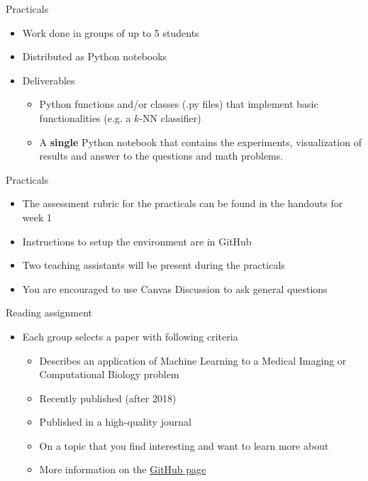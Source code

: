 \documentclass[notes]{beamer}          %
\begin{document}
\begin{frame}{Practicals}
\begin{itemize}
    \item Work done in groups of up to 5 students
    \item Distributed as Python notebooks
    \item Deliverables
    \begin{itemize}
        \item Python functions and/or classes (.py files) that implement basic functionalities (e.g. a $k$-NN classifier)
        \item A \textbf{single} Python notebook that contains the experiments, visualization of results and answer to the questions and math problems.
    \end{itemize}
\end{itemize}    
\end{frame}


\begin{frame}{Practicals}
\begin{itemize}
    \item The assessment rubric for the practicals can be found in the handouts for week 1
    \item Instructions to setup the environment are in GitHub
    \item Two teaching assistants will be present during the practicals
    	\item You are encouraged to use Canvas Discussion to ask general questions
\end{itemize}    
\end{frame}


\begin{frame}{Reading assignment}
\begin{itemize}
    \item Each group selects a paper with following criteria
    \begin{itemize}
        \item Describes an application of Machine Learning to a Medical Imaging or Computational Biology problem
		\item Recently published (after 2018)
		\item Published in a high-quality journal
		\item	 On a topic that you find interesting and want to learn more about
        \item More information on the \href{https://github.com/tueimage/8dm50-machine-learning/blob/master/reading_assignment.md}{GitHub page}
    \end{itemize}
\end{itemize}    


\end{frame}
\end{document}
